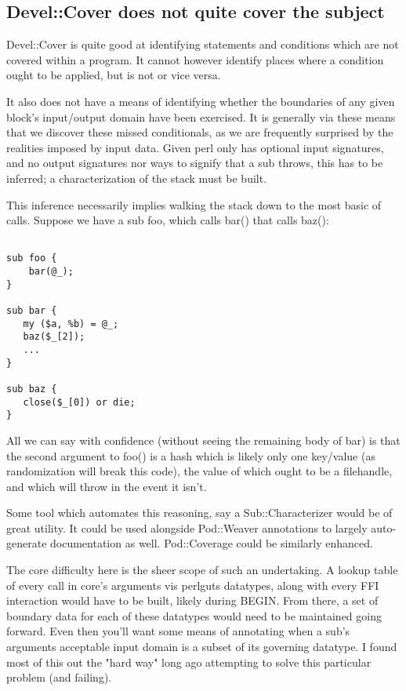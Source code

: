 \documentclass{article}
\begin{document}
\subsection{Devel::Cover does not quite cover the subject}

Devel::Cover is quite good at identifying statements and conditions which are not covered within a program.
It cannot however identify places where a condition ought to be applied, but is not or vice versa.

It also does not have a means of identifying whether the boundaries of any given block's input/output domain have been exercised.
It is generally via these means that we discover these missed conditionals, as we are frequently surprised by the realities imposed by input data.
Given perl only has optional input signatures, and no output signatures nor ways to signify that a sub throws, this has to be inferred;
a characterization of the stack must be built.

This inference necessarily implies walking the stack down to the most basic of calls.
Suppose we have a sub foo, which calls bar() that calls baz():

\begin{lstlisting}

sub foo {
    bar(@_);
}

sub bar {
   my ($a, %b) = @_;
   baz($_[2]);
   ...
}

sub baz {
   close($_[0]) or die;
}

\end{lstlisting}

All we can say with confidence (without seeing the remaining body of bar) is that the second argument to foo() is a hash which is likely only one key/value (as randomization will break this code),
the value of which ought to be a filehandle, and which will throw in the event it isn't.

Some tool which automates this reasoning, say a Sub::Characterizer would be of great utility.
It could be used alongside Pod::Weaver annotations to largely auto-generate documentation as well.
Pod::Coverage could be similarly enhanced.

The core difficulty here is the sheer scope of such an undertaking.
A lookup table of every call in core's arguments vis perlguts datatypes, along with every FFI interaction would have to be built, likely during BEGIN.
From there, a set of boundary data for each of these datatypes would need to be maintained going forward.
Even then you'll want some means of annotating when a sub's arguments acceptable input domain is a subset of its governing datatype.
I found most of this out the "hard way" \cite{gsb} long ago attempting to solve this particular problem (and failing).
\end{document}
